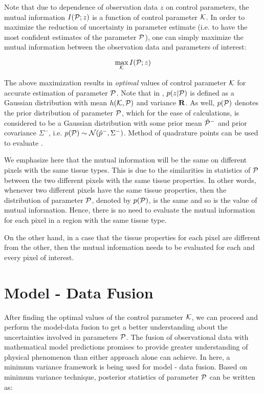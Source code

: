 \documentclass{article}         %
\theoremstyle{definition}
\theoremstyle{remark}
\begin{document}
Note that due to dependence of observation data $z$ on control parameters, the mutual information $I(\mathcal{P};z)$ is a function of control parameter $\mathcal{K}$. In order to maximize the reduction of uncertainty in parameter estimate (i.e. to have the most confident estimates of the parameter $\mathcal{P}$), one can simply maximize the mutual information between the observation data and parameters of interest:

\begin{equation}\label{mimax}
\max_{\mathcal{K}} I(\mathcal{P};z)
\end{equation}

The above maximization results in \textit{optimal} values of control parameter $\mathcal{K}$ for accurate estimation of parameter $\mathcal{P}$. Note that in , $p(z|\mathcal{P})$ is defined as a Gaussian distribution with mean $h(\mathcal{K},\mathcal{P})$ and variance $\mathbf{R}$. As well, $p(\mathcal{P})$ denotes the prior distribution of parameter $\mathcal{P}$, which for the ease of calculations, is considered to be a Gaussian distribution with some prior mean $\hat{\mathcal{P}}^-$ and prior covariance $\Sigma^-$, i.e. $p(\mathcal{P})\sim \mathcal{N}(\hat{p}^-,\Sigma^-)$. Method of quadrature points can be used to evaluate . 

We emphasize here that the mutual information will be the same on different pixels with the same tissue types. This is due to the similarities in statistics of $\mathcal{P}$ between the two different pixels with the same tissue properties. In other words, whenever two different pixels have the same tissue properties, then the distribution of parameter $\mathcal{P}$, denoted by $p(\mathcal{P})$, is the same and so is the value of mutual information. Hence, there is no need to evaluate the mutual information for each pixel in a region with the same tissue type. 

On the other hand, in a case that the tissue properties for each pixel are different from the other, then the mutual information needs to be evaluated for each and every pixel of interest.


\section*{Model - Data Fusion}\label{da}
After finding the optimal values of the control parameter $\mathcal{K}$, we can proceed and perform the model-data fusion to get a better understanding about the uncertainties involved in parameters $\mathcal{P}$.
The fusion of observational data with mathematical model predictions promises to provide greater understanding of physical phenomenon than either approach alone can achieve. In here, a minimum variance framework is being used for model - data fusion. Based on minimum variance technique, posterior statistics of parameter $\mathcal{P}$ can be written as:
\end{document}
